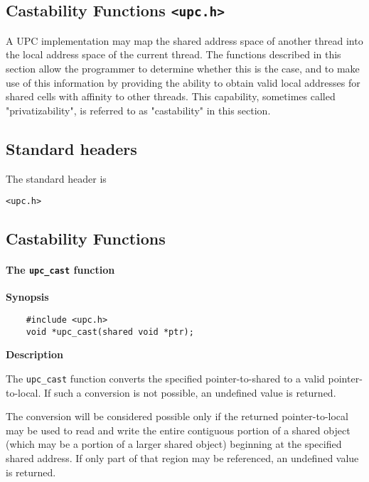 \subsection{Castability Functions {\tt <upc.h>}}
\label{upc-castable}

\np A UPC implementation may map the shared address space of another
thread into the local address space of the current thread.  The
functions described in this section allow the programmer to determine
whether this is the case, and to make use of this information by
providing the ability to obtain valid local addresses for shared cells
with affinity to other threads.  This capability, sometimes called
"privatizability", is referred to as "castability" in this section.

\subsection{Standard headers}

\np The standard header is

{\tt <upc.h>}

\subsection{Castability Functions}

\paragraph{The {\tt upc\_cast} function}

{\bf Synopsis}

\npf\vspace{-2.5em}
\begin{verbatim}
    #include <upc.h>
    void *upc_cast(shared void *ptr);
\end{verbatim}

{\bf Description}

\np The {\tt upc\_cast} function converts the specified
pointer-to-shared to a valid pointer-to-local.  If such a conversion
is not possible, an undefined value is returned.

The conversion will be considered possible only if the returned
pointer-to-local may be used to read and write the entire contiguous
portion of a shared object (which may be a portion of a larger shared
object) beginning at the specified shared address.  If only part of that
region may be referenced, an undefined value is returned.

